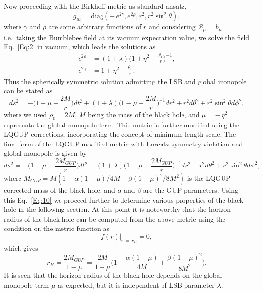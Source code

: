 \documentclass[aps,amsmath,amssymb,showpacs,showkeys]{revtex4}
\begin{document}
Now proceeding with the Birkhoff metric as standard ansatz,
\begin{equation}
g_{\mu\nu}=\text{diag}\left(-\,e^{2\gamma},e^{2\rho},r^2,r^2 \sin^2 \theta\right),
\label{Eq:6}
\end{equation}
where $\gamma$ and $\rho$ are some arbitrary functions of $r$ and considering 
$\mathcal{B}_{\mu}=b_{\mu}$, i.e.\ taking the Bumblebee field at its vacuum 
expectation value, we solve the field Eq.~\eqref{Eq:2} in vacuum, which leads
the solutions as \cite{20}
\begin{align}
e^{2\rho} & = (1+\lambda)\Big(1+\eta^2 -\frac{\rho_{0}}{r}\Big)^{-1}\!\!\!,
\label{Eq:7}\\[5pt]
e^{2\gamma} & = 1+\eta^2 -\frac{\rho_{0}}{r}.
\label{Eq:8}
\end{align}
Thus the spherically symmetric solution admitting the LSB and global monopole 
can be stated as 
\begin{equation}
ds^2=-\bigg(1-\mu-\frac{2M}{r}\bigg)dt^2 +(1+\lambda)\bigg(1-\mu-\frac{2M}{r}\bigg)^{-1} dr^2 +r^2 d\theta^2+r^2 \sin^2 \theta d\phi^2,
\label{Eq:9}
\end{equation}
where we used $\rho_0=2M$, $M$ being the mass of the black hole, and 
$\mu=-\,\eta^2$ represents the global monopole term. This metric is further 
modified using the LQGUP corrections, incorporating the concept of minimum 
length scale. The final form of the LQGUP-modified metric with Lorentz symmetry 
violation and global monopole is given by \cite{20}
\begin{equation}
ds^2=-\bigg(1-\mu-\frac{2M_{GUP}}{r}\bigg)dt^2 +(1+\lambda)\bigg(1-\mu-\frac{2M_{GUP}}{r}\bigg)^{-1} dr^2 +r^2 d\theta^2+r^2 \sin^2 \theta d\phi^2,
\label{Eq:10}
\end{equation} 
where $M_{GUP}=M\left(1-\alpha (1-\mu)/4M + \beta (1-\mu)^2/8M^2\right)$ is 
the LQGUP corrected mass of the black hole, and $\alpha$ and $\beta$ are the 
GUP parameters. Using this Eq.~\eqref{Eq:10} we proceed further to determine 
various properties of the black hole in the following section. At this point 
it is noteworthy that the horizon radius of the black hole can be computed from 
the above metric using the condition on the metric function as 
\begin{equation}
f(r)|_{r\,=\,r_H}=0,
\label{Eq:11}
\end{equation}
which gives
\begin{equation}
r_H=\frac{2M_{GUP}}{1-\mu}=\frac{2M}{1-\mu} \Big(1-\frac{\alpha (1-\mu)}{4M}+\frac{\beta (1-\mu)^2}{8M^2}\Big).
\label{Eq:12}
\end{equation}
It is seen that the horizon radius of the black hole depends on the global 
monopole term $\mu$ as expected, but it is independent of LSB parameter 
$\lambda$. 
\end{document}
